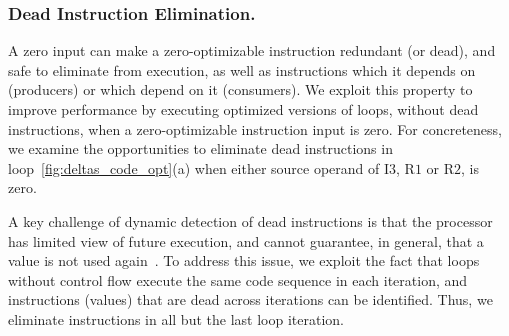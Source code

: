 \subsubsection{Dead Instruction Elimination.} A zero input can make a zero-optimizable instruction redundant (or dead), and safe to eliminate from execution, as well as instructions which it depends on (producers) or which depend on it (consumers).  We exploit this property to improve performance by executing optimized versions of loops, without dead instructions, when a zero-optimizable instruction input is zero.  For concreteness, we examine the opportunities to eliminate dead instructions in loop~\ref{fig:deltas_code_opt}(a) when either source operand of I$3$, R$1$ or R$2$, is zero.  

A key challenge of dynamic detection of dead instructions is that the processor has limited view of future execution, and cannot guarantee, in general, that a value is not used again~\cite{Butts02}.  To address this issue, we exploit the fact that loops without control flow execute the same code sequence in each iteration, and instructions (values) that are dead across iterations can be identified. Thus, we eliminate instructions in all but the last loop iteration. 

